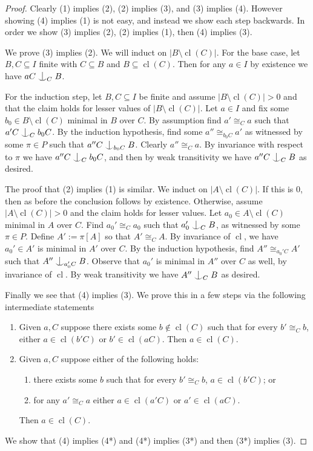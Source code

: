 \documentclass[10pt,a4paper]{amsart}
\DeclareMathOperator{\cl}{cl}
\newcommand{\forkindep}[1][]{%
  \mathrel{
    \mathop{
      \vcenter{
        \hbox{\oalign{\noalign{\kern-.3ex}\hfil$\vert$\hfil\cr
              \noalign{\kern-.7ex}
              $\smile$\cr\noalign{\kern-.3ex}}}
      }
    }\displaylimits_{#1}
  }
}
\newcommand{\isom}{\cong}
\begin{document}
\begin{proof}
Clearly (1) implies (2), (2) implies (3), and (3) implies (4).
However showing (4) implies (1) is not easy, and instead we show each step backwards. In order we show (3) implies (2), (2) implies (1), then (4) implies (3).

We prove (3) implies (2).
We will induct on $|B \setminus \cl(C)|$.
For the base case, let $B, C \subseteq I$ finite with $C \subseteq B$ and $B \subseteq \cl(C)$.
Then for any $a \in I$ by existence we have $aC \forkindep[C] B$.

For the induction step, let $B, C \subseteq I$ be finite and assume $|B \setminus \cl(C)| > 0$ and that the claim holds for lesser values of $|B \setminus \cl(C)|$.
Let $a \in I$ and fix some $b_0 \in B \setminus \cl(C)$ minimal in $B$ over $C$.
By assumption find $a' \isom_C a$ such that $a'C \forkindep[C] b_0C$. 
By the induction hypothesis, find some $a'' \isom_{b_0C} a'$ as witnessed by some $\pi \in P$ such that $a''C \forkindep[b_0C] B$.
Clearly $a'' \isom_C a$.
By invariance with respect to $\pi$ we have $a''C \forkindep[C] b_0C$, and then by weak transitivity we have $a''C \forkindep[C] B$ as desired.

The proof that (2) implies (1) is similar.
We induct on $|A \setminus \cl(C)|$. 
If this is 0, then as before the conclusion follows by existence.
Otherwise, assume $|A \setminus \cl(C)| > 0$ and the claim holds for lesser values.
Let $a_0 \in A \setminus \cl(C)$ minimal in $A$ over $C$.
Find $a_0' \isom_C a_0$ such that $a_0' \forkindep[C] B$, as witnessed by some $\pi \in P$.
Define $A' := \pi[A]$ so that $A' \isom_C A$.
By invariance of $\cl$, we have $a_0' \in A'$ is minimal in $A'$ over $C$.
By the induction hypothesis, find $A'' \isom_{a_0'C} A'$ such that $A'' \forkindep[a_0'C] B$.
Observe that $a_0'$ is minimal in $A''$ over $C$ as well, by invariance of $\cl$.
By weak transitivity we have $A'' \forkindep[C] B$ as desired.

Finally we see that (4) implies (3). 
We prove this in a few steps via the following intermediate statements
\begin{enumerate}
    \item[(3*)] Given $a, C$ suppose there exists some $b \not\in \cl(C)$ such that for every $b' \isom_C b$, either $a \in \cl(b'C)$ or $b' \in \cl(aC)$. Then $a \in \cl(C)$.
    \item[(4*)] Given $a, C$ suppose either of the following holds:
    \begin{enumerate}
        \item[(a)] there exists some $b$ such that for every $b' \isom_C b$, $a \in \cl(b'C)$; or
        \item[(b)] for any $a' \isom_C a$ either $a \in \cl(a'C)$ or $a' \in \cl(aC)$.
    \end{enumerate}
    Then $a \in \cl(C)$.
\end{enumerate}
We show that (4) implies (4*) and (4*) implies (3*) and then (3*) implies (3).


\end{proof}
\end{document}
